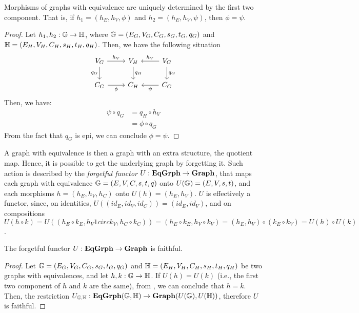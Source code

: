\begin{obs}\label{obs:eq_grph_morph_det_by_first_two_comp}
    Morphisms of graphs with equivalence are uniquely determined by the first two component. That is, if $h_1 = (h_E, h_V, \phi)$ and $h_2 = (h_E, h_V, \psi)$, then $\phi = \psi$.
\end{obs}

\begin{proof}
    Let $h_1, h_2 : \mathbb{G \to H}$, where $\mathbb{G} = (E_G, V_G, C_G, s_G, t_G, q_G)$ and $\mathbb{H} = (E_H, V_H, C_H, s_H, t_H, q_H)$. Then, we have the following situation
    \[
        \begin{tikzcd}
            V_G \arrow[r, "{h_V}"] \arrow[d, "{q_G}"swap] & V_H \arrow[d, "{q_H}"] & V_G \arrow[l, "{h_V}"swap] \arrow[d, "{q_G}"] \\
            C_G \arrow[r, "{\phi}"swap] & C_H & \arrow[l, "{\psi}"] C_G
        \end{tikzcd}
     \]
     Then, we have:
     \begin{align*}
         \psi \circ q_G &= q_H \circ h_V \\
                        &= \phi \circ q_G
     \end{align*}
     From the fact that $q_G$ is epi, we can conclude $\phi = \psi$.
\end{proof}

A graph with equivalence is then a graph with an extra structure, the quotient map. Hence, it is possible to get the underlying graph by forgetting it. Such action is described by the \emph{forgetful functor} $U : \mathbf{EqGrph} \to \mathbf{Graph}$, that maps each graph with equivalence $\mathbb{G} =  (E, V, C, s, t, q)$ onto $U(\mathbb{G}) = (E, V, s, t)$, and each morphisms $h = (h_E, h_V, h_C)$ onto $U(h) = (h_E, h_V)$. $U$ is effectively a functor, since, on identities, $U((id_E, id_V, id_C)) = (id_E, id_V)$, and on compositions $U(h \circ k) = U((h_E \circ k_E, h_V 1circ k_V, h_C \circ k_C)) = (h_E \circ k_E, h_V \circ k_V) = (h_E, h_V) \circ (k_E \circ k_V) = U(h) \circ U(k)$.

\begin{prop}\label{prop:U_is_faithf}
    The forgetful functor $U: \mathbf{EqGrph} \to \mathbf{Graph}$ is faithful.
\end{prop}

\begin{proof}
    Let $\mathbb{G} = (E_G, V_G, C_G, s_G, t_G, q_G)$ and $\mathbb{H} = (E_H, V_H, C_H, s_H, t_H, q_H)$  be two graphs with equivalences, and let $h, k : \mathbb{G \to H}$.
    If $U(h) = U(k)$ (i.e., the first two component of $h$ and $k$ are the same), from , we can conclude that $h = k$. Then, the restriction $U_{\mathbb{G, H}} : \mathbf{EqGrph}(\mathbb{G, H}) \to \mathbf{Graph}(U(\mathbb{G}), U(\mathbb{H}))$, therefore $U$ is faithful.
\end{proof}

